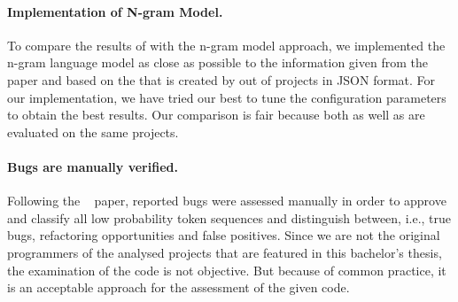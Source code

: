 \paragraph{Implementation of N-gram Model.}
To compare the results of \litterbox{} with the n-gram model approach, we implemented the n-gram language model as close as possible to the information given from the \bugram{}~\cite{bugram} paper and based on the \AST{} that is created by \litterbox{} out of \scratch{} projects in JSON format. For our implementation, we have tried our best to tune the configuration parameters to obtain the best results. Our comparison is fair because both \litterbox{} as well as \ngram{} are evaluated on the same projects.

\paragraph{Bugs are manually verified.}
Following the \bugram{}~\cite{bugram} paper, reported bugs were assessed manually in order to approve and classify all low probability token sequences and distinguish between, i.e., true bugs, refactoring opportunities and false positives. Since we are not the original programmers of the analysed projects that are featured in this bachelor's thesis, the examination of the code is not objective. But because of common practice, it is an acceptable approach for the assessment of the given code.


